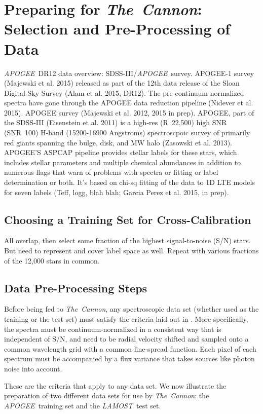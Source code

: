 \documentclass[12pt, preprint]{aastex}
\newcommand{\tc}{\textsl{The~Cannon}}
\newcommand{\apogee}{\textsl{APOGEE}}
\newcommand{\lamost}{\textsl{LAMOST}}
\begin{document}
\section{Preparing for \tc: Selection and Pre-Processing of Data}

\apogee\ DR12 data overview: SDSS-III/\apogee\ survey. APOGEE-1 survey 
(Majewski et al. 2015) released as part of the 12th data release of the Sloan
Digital Sky Survey (Alam et al. 2015, DR12). The pre-continuum normalized
spectra have gone through the APOGEE data reduction pipeline 
(Nidever et al. 2015). APOGEE survey (Majewski et al. 2012, 2015 in prep). 
APOGEE, part of the SDSS-III (Eisenstein et al. 2011) is a high-res
(R~22,500) high SNR (SNR~100) H-band (15200-16900 Angstroms) spectroscpoic
survey of primarily red giants spanning the bulge, disk, and MW halo 
(Zasowski et al. 2013). APOGEE'S ASPCAP pipeline provides stellar labels for
these stars, which includes stellar parameters and multiple chemical 
abundances in addition to numerous flags that warn of problems with spectra
or fitting or label determination or both. It's based on chi-sq fitting of
the data to 1D LTE models for seven labels (Teff, logg, blah blah; Garcia 
Perez et al. 2015, in prep). 
\subsection{Choosing a Training Set for Cross-Calibration}

All overlap, then select some fraction of the highest signal-to-noise (S/N) 
stars. But need to represent and cover label space as well. Repeat with 
various fractions of the 12,000 stars in common.

\subsection{Data Pre-Processing Steps}

Before being fed to \tc, any spectroscopic data set (whether used as the 
training or the test set) must satisfy the criteria laid out in 
\citep{ness2015}. More specifically, the spectra must be
continuum-normalized in a consistent way that is independent of S/N, and need
to be radial velocity shifted and sampled onto a common wavelength grid with
a common line-spread function. Each pixel of each spectrum must be accompanied
by a flux variance that takes sources like photon noise into account. 

These are the criteria that apply to any data set. We now illustrate the 
preparation of two different data sets for use by \tc: the \apogee\ training
set and the \lamost\ test set. 
\end{document}
